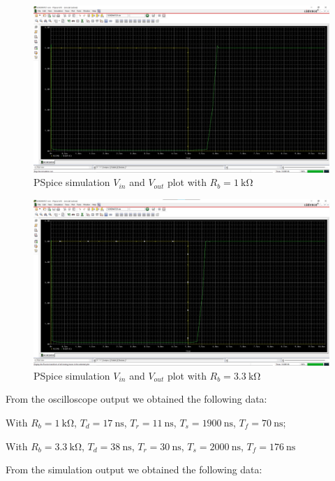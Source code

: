 \documentclass{article}
\begin{document}
\begin{figure}[H]
  \centering
  \includegraphics[width=\textwidth]{ECE2200L_Lab11_PSpice_plot_1k.png}
  \caption{PSpice simulation $V_{in}$ and $V_{out}$ plot with $R_b = \SI{1}{\kilo\ohm}$}
  \label{fig:plot1k}
\end{figure}
\begin{figure}[H]
  \centering
  \includegraphics[width=\textwidth]{ECE2200L_Lab11_PSpice_plot_3_3k.png}
  \caption{PSpice simulation $V_{in}$ and $V_{out}$ plot with $R_b = \SI{3.3}{\kilo\ohm}$}
  \label{fig:plot3k3}
\end{figure}

From the oscilloscope output we obtained the following data:

With $R_b = \SI{1}{\kilo\ohm}$, $T_d=\SI{17}{\nano\second}$, $T_r=\SI{11}{\nano\second}$, $T_s=\SI{1900}{\nano\second}$, $T_f=\SI{70}{\nano\second}$;

With $R_b = \SI{3.3}{\kilo\ohm}$, $T_d=\SI{38}{\nano\second}$, $T_r=\SI{30}{\nano\second}$, $T_s=\SI{2000}{\nano\second}$, $T_f=\SI{176}{\nano\second}$


From the simulation output we obtained the following data:
\end{document}
